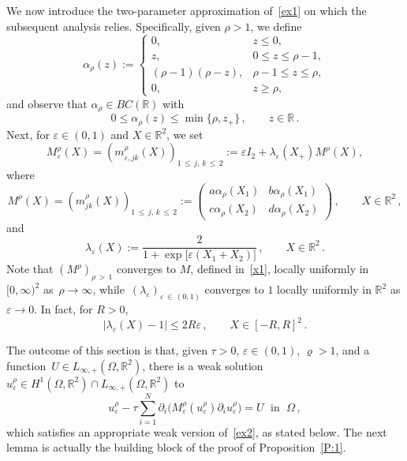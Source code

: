 \documentclass[10pt]{amsart}
\theoremstyle{definition}\newtheorem{defi}[theo]{Definition}\newtheorem{rema}[theo]{Remark}\newtheorem{exam}[theo]{Example}\newtheorem{exem}[theo]{Example}\newtheorem{nota}[theo]{Notation}
\newcommand{\bbR}{\mathbb{R}}
\begin{document}
We now introduce the two-parameter approximation of~\eqref{ex1} on which the subsequent analysis relies. Specifically, given $\rho>1$, we define
\begin{equation*}
\alpha_\rho(z):=
\left\{
\begin{array}{clll}
0, &z\leq 0,\\
z, &0\leq z\leq \rho-1,\\
(\rho-1)(\rho-z), &\rho-1\leq z\leq \rho,\\
0, &z\geq\rho,
\end{array}
\right.
\end{equation*}
and observe that $\alpha_\rho\in BC(\bbR)$ with
\begin{equation*}
0\le \alpha_\rho(z)\le \min\{\rho, z_+\}\,, \qquad z\in\bbR\,.
\end{equation*}
Next, for $\varepsilon\in (0,1)$ and $X\in\bbR^2$, we set
\begin{equation*}
M_{\varepsilon}^\rho(X) = \left(m_{\varepsilon, jk}^\rho(X)\right)_{1\,\le\,j,\,k\,\le\,2}:= \varepsilon I_2 + \lambda_\varepsilon(X_{+}) M^\rho(X),
\end{equation*}
where
\begin{equation}\label{momar}
M^\rho(X) = \left(m_{jk}^\rho(X)\right)_{1\,\le\, j,\,k\,\le\,2} :=
\begin{pmatrix}
a\alpha_\rho(X_1) & b\alpha_\rho(X_1) \\
c\alpha_\rho(X_2) & d\alpha_\rho(X_2)
\end{pmatrix}\,, \qquad X\in\bbR^2\,,
\end{equation}
and
\begin{equation*}
\lambda_\varepsilon(X) := \frac{2}{1+\exp{[\varepsilon (X_1+X_2)}]}\,, \qquad X\in\bbR^2\,.
\end{equation*}
Note that $(M^\rho)_{\rho\,>\,1}$ converges to $M$, defined in~\eqref{x1}, locally uniformly in $[0,\infty)^2$ as~$\rho\to\infty$, while~$(\lambda_\varepsilon)_{\varepsilon\,\in\,(0,1)}$ converges to $1$ locally uniformly in $\bbR^2$ as $\varepsilon\to 0$. In fact, for $R>0$,
\begin{equation}\label{UL}
|\lambda_\varepsilon(X) - 1| \le 2 R \varepsilon\,, \qquad X\in [-R,R]^2\,. 
\end{equation}

The outcome of this section is that, given $\tau>0$, $\varepsilon\in (0,1)$, $\varrho>1$, and a function~$U\in L_{\infty,+}(\Omega,\bbR^2)$, there is a weak solution $u_\varepsilon^\rho\in H^1(\Omega,\bbR^2)\cap L_{\infty,+}(\Omega,\bbR^2)$ to
\begin{equation*}
u_\varepsilon^\rho - \tau \sum_{i=1}^N\partial_i \big(M_\varepsilon^\rho(u_\varepsilon^\rho) \partial_i u_\varepsilon^\rho \big) = U \;\text{ in }\; \Omega\,,
\end{equation*}
which satisfies an appropriate weak version of~\eqref{ex2}, as stated below. The next lemma is actually the building block of the proof of Proposition~\ref{P:1}.
\end{document}

